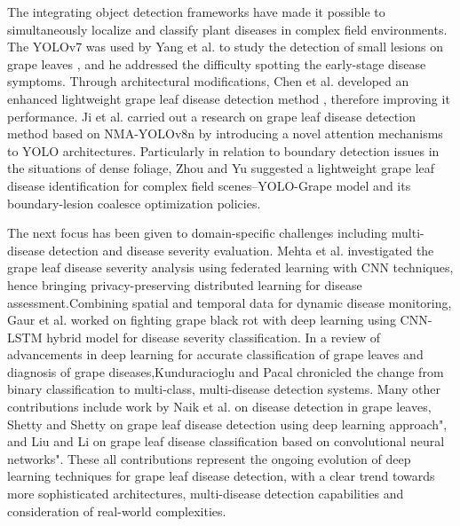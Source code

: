 The integrating object detection frameworks have made it possible to simultaneously localize and classify plant diseases in complex field environments. The YOLOv7 was used by Yang et al. to study the detection of small lesions on grape leaves \cite{yang2024detection}, and he addressed the difficulty spotting the early-stage disease symptoms. Through architectural modifications, Chen et al. developed an enhanced lightweight grape leaf disease detection method \cite{chen2024yolov8}, therefore improving it performance. Ji et al. carried out a research on grape leaf disease detection method based on NMA-YOLOv8n by introducing a novel attention mechanisms to YOLO architectures\cite{ji2025research}. Particularly in relation to boundary detection issues in the situations of dense foliage, Zhou and Yu suggested a lightweight grape leaf disease identification for complex field scenes–YOLO-Grape model and its boundary-lesion coalesce optimization policies\cite{zhou2025lightweight}.



The next focus has been given to domain-specific challenges including multi-disease detection and disease severity evaluation. Mehta et al.  investigated the grape leaf disease severity analysis using federated learning with CNN techniques\cite{mehta2023grape},  hence bringing privacy-preserving distributed learning for disease assessment.Combining spatial and temporal data for dynamic disease monitoring, Gaur et al. worked on fighting grape black rot with deep learning using CNN-LSTM hybrid model for disease severity classification\cite{gaur2023fighting}. In a review of advancements in deep learning for accurate classification of grape leaves and diagnosis of grape diseases\cite{kunduracioglu2024advancements},Kunduracioglu and Pacal chronicled the change from binary classification to multi-class, multi-disease detection systems. Many other contributions include work by Naik et al. on disease detection in grape leaves\cite{naik2025disease}, Shetty and Shetty on grape leaf disease detection using deep learning approach"\cite{shetty2025grape}, and Liu and Li on grape leaf disease classification based on convolutional neural networks"\cite{liu2025grape}. These all contributions represent the ongoing evolution of deep learning techniques for grape leaf disease detection, with a clear trend towards more sophisticated architectures, multi-disease detection capabilities and consideration of real-world complexities.



